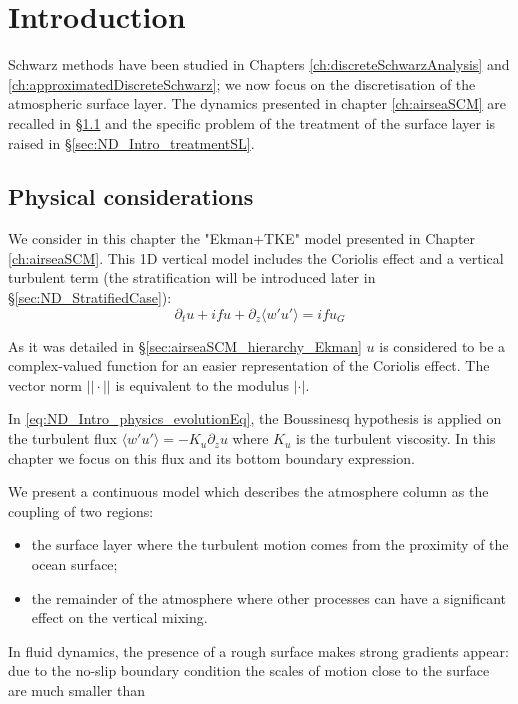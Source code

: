 \section{Introduction}
Schwarz methods have been studied in Chapters
\ref{ch:discreteSchwarzAnalysis} and
\ref{ch:approximatedDiscreteSchwarz}; we now focus
on the discretisation of the atmospheric surface layer.
The dynamics presented in chapter \ref{ch:airseaSCM} are
recalled in \S \ref{sec:ND_Intro_continuousModel} and
the specific problem of the treatment of the surface layer
is raised in \S \ref{sec:ND_Intro_treatmentSL}.
\subsection{Physical considerations}
\label{sec:ND_Intro_continuousModel}
We consider in this chapter the "Ekman+TKE" model presented
in Chapter \ref{ch:airseaSCM}.
This 1D vertical model includes the Coriolis effect
and a vertical turbulent term (the stratification
will be introduced later in \S\ref{sec:ND_StratifiedCase}):
\begin{equation}
	\label{eq:ND_Intro_physics_evolutionEq}
	\partial_t u + i f u + \partial_z \langle w'u'\rangle
	= i f u_G 
\end{equation}
\begin{remark}
As it was detailed in \S \ref{sec:airseaSCM_hierarchy_Ekman}
$u$ is considered to be a complex-valued function for an easier
representation of the Coriolis effect.
The vector norm $||\cdot||$ is equivalent to the modulus
$|\cdot|$.
\end{remark}
In \eqref{eq:ND_Intro_physics_evolutionEq}, the
Boussinesq hypothesis is applied on the turbulent flux
$\langle w'u' \rangle = - K_u \partial_z u$ where
$K_u$ is the turbulent viscosity.
In this chapter we focus on this flux and its bottom boundary
expression.
\par
We present a continuous model which describes the atmosphere
column as the coupling of two regions:
\begin{itemize}
		\item the surface layer where the turbulent motion
			comes from the proximity of the ocean surface;
		\item the remainder of the atmosphere where other
			processes can have a significant effect
			on the vertical mixing.
\end{itemize}
In fluid dynamics, the presence of a rough surface makes strong
gradients appear:
due to the no-slip boundary condition
the scales of motion close to the surface are much smaller than
